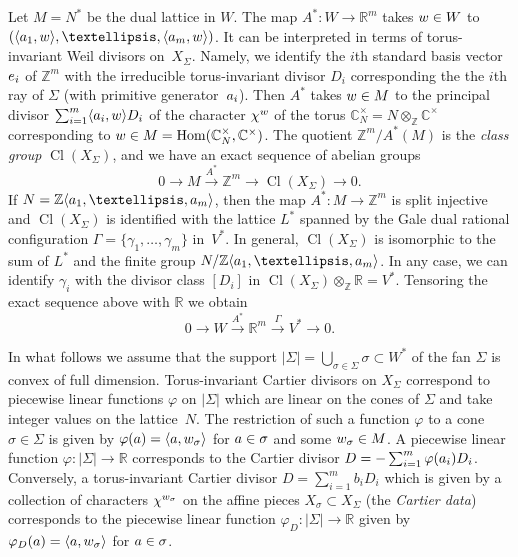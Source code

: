 \documentclass[a4paper]{amsart}
\theoremstyle{definition}
\theoremstyle{remark}
\numberwithin{equation}{section}
\def\R{\mathbb R}
\def\C{\mathbb C}
\def\R{\mathbb R}
\def\Z{\mathbb Z}
\newcommand{\mb}[1]{{\textbf {\textit#1}}}
\def\Hom{\mathop{\mathrm{Hom}}}
\newcommand{\<}{\langle}
\renewcommand{\>}{\rangle}
\begin{document}
Let $M=N^*$ be the dual lattice in $W$. The map $A^*\colon W\to\R^m$ takes 
$\mb w\in W$ to $(\langle\mb a_1,\mb w\rangle,\ldots,\langle\mb a_m,\mb w\rangle)$. It can be interpreted in terms of torus-invariant Weil divisors on~$X_\Sigma$. Namely, we identify the $i$th standard basis vector $\mb e_i$ of $\Z^m$ with the irreducible torus-invariant divisor $D_i$ corresponding the the $i$th ray of $\Sigma$ (with primitive generator~$\mb a_i$). Then $A^*$ takes $\mb w\in M$ to the principal divisor $\sum_{i=1}^m\langle\mb a_i,\mb w\rangle D_i$ of the character $\chi^{\mb w}$ of the torus $\C^\times_N=N\otimes_\Z\C^\times$ corresponding to $\mb w\in M=\Hom(\C^\times_N,\C^\times)$. The quotient $\Z^m/A^*(M)$ is the \emph{class group} $\mathop\mathrm{Cl}(X_\Sigma)$, and we have an exact sequence of abelian groups
\[
  0\longrightarrow M \stackrel{A^*}\longrightarrow \Z^m 
  \longrightarrow \mathop\mathrm{Cl}(X_\Sigma) \longrightarrow 0.
\]
If $N=\Z\langle\mb a_1,\ldots,\mb a_m\rangle$, then the map $A^*\colon M\to\Z^m$ is split injective and $\mathop\mathrm{Cl}(X_\Sigma)$ is identified with the lattice $L^*$ spanned by the Gale dual rational configuration $\Gamma=\{\gamma_1,\ldots,\gamma_m\}$ in~$V^*$. In general, $\mathop\mathrm{Cl}(X_\Sigma)$ is isomorphic to the sum of $L^*$ and the finite group $N/\Z\langle \mb a_1,\ldots,\mb a_m\rangle$. In any case, we can identify $\gamma_i$ with the divisor class $[D_i]$ in $\mathop\mathrm{Cl}(X_\Sigma)\otimes_\Z\R=V^*$. Tensoring the exact sequence above with $\R$ we obtain
\begin{equation}\label{Rclas}
  0\longrightarrow W \stackrel{A^*}\longrightarrow \R^m 
  \stackrel{\varGamma}\longrightarrow V^* \longrightarrow 0.
\end{equation}


In what follows we assume that the support $|\Sigma|=\bigcup_{\sigma\in\Sigma}\sigma\subset W^*$ of the fan $\Sigma$ is convex of full dimension. Torus-invariant Cartier divisors on $X_\Sigma$ correspond to piecewise linear functions $\varphi$ on $|\Sigma|$ which are linear on the cones of $\Sigma$ and take integer values on the lattice~$N$. The restriction of such a function $\varphi$ to a cone 
$\sigma\in\Sigma$ is given by $\varphi(\mb a)=\langle \mb a,\mb w_\sigma\rangle$ for $\mb a\in\sigma$ and some $\mb w_\sigma\in M$. A piecewise linear function $\varphi\colon|\Sigma|\to\R$ corresponds to the Cartier divisor $D=-\sum_{i=1}^m\varphi(\mb a_i)D_i$. Conversely, a torus-invariant Cartier divisor $D=\sum_{i=1}^m b_iD_i$ which is given by a collection of characters $\chi^{\mb w_\sigma}$ on the affine pieces $X_\sigma\subset X_\Sigma$ (the \emph{Cartier data}) corresponds to the piecewise linear function $\varphi_D \colon|\Sigma|\to\R$ given by 
$\varphi_D(\mb a)=\langle \mb a,\mb w_\sigma\rangle$ for $\mb a\in\sigma$.
\end{document}
